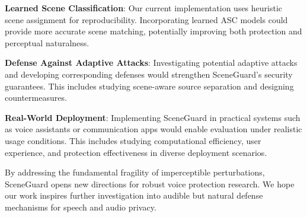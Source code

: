 \textbf{Learned Scene Classification}: Our current implementation uses heuristic scene assignment for reproducibility. Incorporating learned ASC models could provide more accurate scene matching, potentially improving both protection and perceptual naturalness.

\textbf{Defense Against Adaptive Attacks}: Investigating potential adaptive attacks and developing corresponding defenses would strengthen SceneGuard's security guarantees. This includes studying scene-aware source separation and designing countermeasures.

\textbf{Real-World Deployment}: Implementing SceneGuard in practical systems such as voice assistants or communication apps would enable evaluation under realistic usage conditions. This includes studying computational efficiency, user experience, and protection effectiveness in diverse deployment scenarios.

By addressing the fundamental fragility of imperceptible perturbations, SceneGuard opens new directions for robust voice protection research. We hope our work inspires further investigation into audible but natural defense mechanisms for speech and audio privacy.

